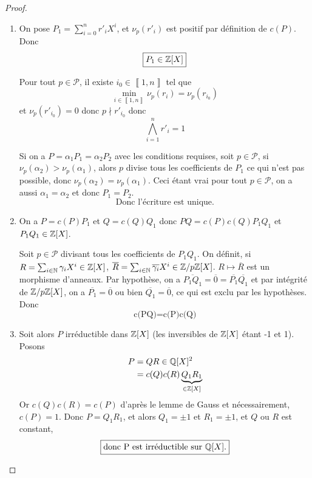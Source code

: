\documentclass[12pt]{article}
\begin{document}
\begin{proof}
	\phantom{}
	\begin{enumerate}
		\item On pose $P_{1}=\sum_{i=0}^{n}r'_{i}X^{i}$, et $\nu_{p}(r'_{i})$ est positif par définition de $c(P)$. Donc
		\begin{equation}
			\boxed{P_{1}\in\mathbb{Z}[X]}
		\end{equation}
		
		Pour tout $p\in\mathcal{P}$, il existe $i_{0}\in\left\llbracket 1,n\right\rrbracket$ tel que 
		\begin{equation}
			\min\limits_{i\in\left\llbracket 1,n\right\rrbracket}\nu_{p}(r_{i})=\nu_{p}(r_{i_{0}})
		\end{equation}
		et $\nu_{p}(r'_{i_{0}})=0$ donc $p\nmid r'_{i_{0}}$ donc 
		\begin{equation}
			\bigwedge_{i=1}^{n}r'_{i}=1
		\end{equation}

		Si on a $P=\alpha_{1}P_{1}=\alpha_{2}P_{2}$ avec les conditions requises, soit $p\in\mathcal{P}$, si $\nu_{p}(\alpha_{2})>\nu_{p}(\alpha_{1})$, alors $p$ divise tous les coefficients de $P_{1}$ ce qui n'est pas possible, donc $\nu_{p}(\alpha_{2})=\nu_{p}(\alpha_{1})$. Ceci étant vrai pour tout $p\in\mathcal{P}$, on a aussi $\alpha_{1}=\alpha_{2}$ et donc $P_{1}=P_{2}$. 
		\begin{equation}
			\boxed{\text{Donc l'écriture est unique.}}
		\end{equation}

		\item On a $P=c(P)P_{1}$ et $Q=c(Q)Q_{1}$ donc $PQ=c(P)c(Q)P_{1}Q_{1}$ et $P_{1}Q_{1}\in\mathbb{Z}[X]$.
		
		Soit $p\in\mathcal{P}$ divisant tous les coefficients de $P_{1}Q_{1}$. On définit, si $R=\sum_{i\in\mathbb{N}}\gamma_{i}X^{i}\in\mathbb{Z}[X]$, $\overline{R}=\sum_{i\in\mathbb{N}}\overline{\gamma_{i}}X^{i}\in\mathbb{Z}/p\mathbb{Z}[X]$. $R\mapsto\overline{R}$ est un morphisme d'anneaux. Par hypothèse, on a $\overline{P_{1}Q_{1}}=\overline{0}=\overline{P_{1}}\overline{Q_{1}}$ et par intégrité de $\mathbb{Z}/p\mathbb{Z}[X]$, on a $\overline{P_{1}}=\overline{0}$ ou bien $\overline{Q_{1}}=\overline{0}$, ce qui est exclu par les hypothèses. Donc
		\begin{equation}
			\boxed{\text{c(PQ)=c(P)c(Q)}}
		\end{equation}

		\item 
		Soit alors $P$ irréductible dans $\mathbb{Z}[X]$ (les inversibles de $\mathbb{Z}[X]$ étant -1 et 1). Posons 
		\begin{align}
			P
			&=QR\in\mathbb{Q}[X]^{2}\\
			&=c(Q)c(R)\underbrace{Q_{1}R_{1}}_{\in\mathbb{Z}[X]}
		\end{align}
		Or $c(Q)c(R)=c(P)$ d'après le lemme de Gauss et nécessairement, $c(P)=1$. Donc $P=Q_{1}R_{1}$, et alors $Q_{1}=\pm 1$ et $R_{1}=\pm 1$, et $Q$ ou $R$ est constant, 
		\begin{equation}
			\boxed{\text{donc P est irréductible sur }\mathbb{Q}[X].}
		\end{equation}


\end{enumerate}
\end{proof}
\end{document}
